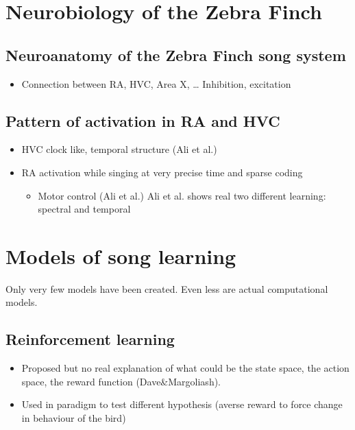 \section{Neurobiology of the Zebra
Finch}\label{neurobiology-of-the-zebra-finch}

\subsection{Neuroanatomy of the Zebra Finch song
system}\label{neuroanatomy-of-the-zebra-finch-song-system}

\begin{itemize}
\tightlist
\item
  Connection between RA, HVC, Area X, \ldots{} Inhibition, excitation
\end{itemize}

\subsection{Pattern of activation in RA and
HVC}\label{pattern-of-activation-in-ra-and-hvc}

\begin{itemize}
\tightlist
\item
  HVC clock like, temporal structure (Ali et al.)
\item
  RA activation while singing at very precise time and sparse coding

  \begin{itemize}
  \tightlist
  \item
    Motor control (Ali et al.) Ali et al. shows real two different
    learning: spectral and temporal
  \end{itemize}
\end{itemize}

\section{Models of song learning}\label{models-of-song-learning}

Only very few models have been created. Even less are actual
computational models.

\subsection{Reinforcement learning}\label{reinforcement-learning}

\begin{itemize}
\tightlist
\item
  Proposed but no real explanation of what could be the state space, the
  action space, the reward function (Dave\&Margoliash).
\item
  Used in paradigm to test different hypothesis (averse reward to force
  change in behaviour of the bird)
\end{itemize}

